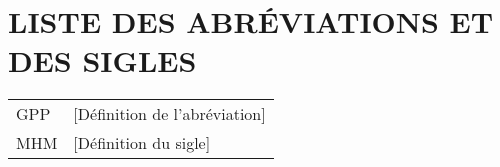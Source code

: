 \chapter*{LISTE DES ABRÉVIATIONS ET DES SIGLES}

\begin{tabular}{ ll } 
 GPP & [Définition de l’abréviation] \\ 
 MHM & [Définition du sigle] \\ 
 \end{tabular}


